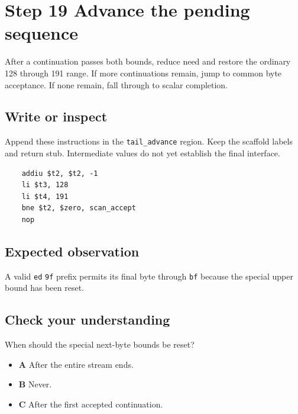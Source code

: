 \section{Step 19 Advance the pending sequence}\label{utf8-s19}

After a continuation passes both bounds, reduce need and restore the ordinary 128 through 191 range. If more continuations remain, jump to common byte acceptance. If none remain, fall through to scalar completion.

\subsection{Write or inspect}
Append these instructions in the \texttt{tail\_advance} region. Keep the scaffold labels and return stub. Intermediate values do not yet establish the final interface.

\begin{verbatim}
    addiu $t2, $t2, -1
    li $t3, 128
    li $t4, 191
    bne $t2, $zero, scan_accept
    nop
\end{verbatim}

\subsection{Expected observation}
A valid \texttt{ed} \texttt{9f} prefix permits its final byte through \texttt{bf} because the special upper bound has been reset.

\subsection{Check your understanding}
When should the special next-byte bounds be reset?

\begin{itemize}
  \item \textbf{A} After the entire stream ends.
  \item \textbf{B} Never.
  \item \textbf{C} After the first accepted continuation.
\end{itemize}
